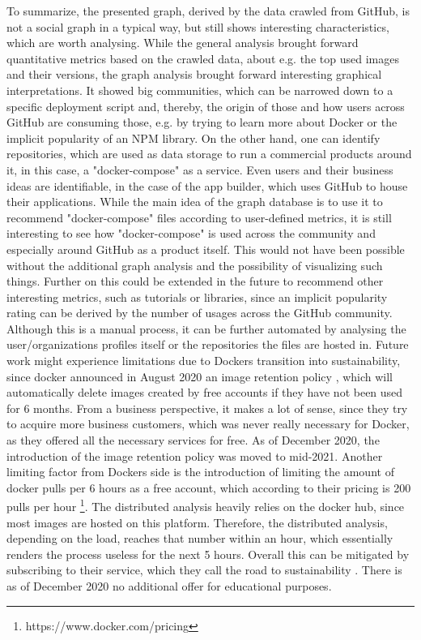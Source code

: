 To summarize, the presented graph, derived by the data crawled from GitHub, is not a social graph in a typical way, but still shows interesting characteristics, which are worth analysing. While the general analysis brought forward quantitative metrics based on the crawled data, about e.g. the top used images and their versions, the graph analysis brought forward interesting graphical interpretations. It showed big communities, which can be narrowed down to a specific deployment script and, thereby, the origin of those and how users across GitHub are consuming those, e.g. by trying to learn more about Docker or the implicit popularity of an NPM library. On the other hand, one can identify repositories, which are used as data storage to run a commercial products around it, in this case, a "docker-compose" as a service. Even users and their business ideas are identifiable, in the case of the app builder, which uses GitHub to house their applications. While the main idea of the graph database is to use it to recommend "docker-compose" files according to user-defined metrics, it is still interesting to see how "docker-compose" is used across the community and especially around GitHub as a product itself. This would not have been possible without the additional graph analysis and the possibility of visualizing such things. Further on this could be extended in the future to recommend other interesting metrics, such as tutorials or libraries, since an implicit popularity rating can be derived by the number of usages across the GitHub community. Although this is a manual process, it can be further automated by analysing the user/organizations profiles itself or the repositories the files are hosted in.
\label{sec:futureDocker}
Future work might experience limitations due to Dockers transition into sustainability, since docker announced in August 2020 an image retention policy \cite{dockerBusiness}, which will automatically delete images created by free accounts if they have not been used for 6 months. From a business perspective, it makes a lot of sense, since they try to acquire more business customers, which was never really necessary for Docker, as they offered all the necessary services for free. As of December 2020, the introduction of the image retention policy was moved to mid-2021. Another limiting factor from Dockers side is the introduction of limiting the amount of docker pulls per 6 hours as a free account, which according to their pricing is 200 pulls per hour \footnote{https://www.docker.com/pricing}. The distributed analysis heavily relies on the docker hub, since most images are hosted on this platform. Therefore, the distributed analysis, depending on the load, reaches that number within an hour, which essentially renders the process useless for the next 5 hours. Overall this can be mitigated by subscribing to their service, which they call the road to sustainability \cite{dockerChapter}. There is as of December 2020 no additional offer for educational purposes.
